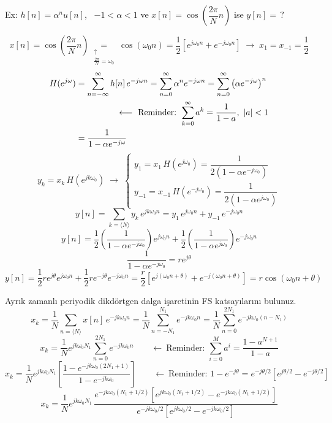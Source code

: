 \documentclass[11pt,a4paper]{article}
\begin{document}
\begin{ornek}
Ex: $h[n]=\alpha^n u[n]$, \ $-1<\alpha<1$ ve $x[n]=\cos\left(\dfrac{2\pi}{N}n\right)$ ise $y[n]=\,?$
\end{ornek}
\[ x[n]=\cos\left(\frac{2\pi}{N}n\right)\underset{\substack{\uparrow\\ \frac{2\pi}{N}=\omega_0}}{=}\cos(\omega_0 n)=\frac{1}{2}\left[e^{j\omega_0 n}+e^{-j\omega_0 n}\right] \;\longrightarrow\; x_1=x_{-1}=\frac{1}{2} \]
\begin{align*}
H(e^{j\omega}) &= \sum_{n=-\infty}^{\infty} h[n]\,e^{-j\omega n}=\sum_{n=0}^{\infty}\alpha^n e^{-j\omega n}=\sum_{n=0}^{\infty}\left(\alpha e^{-j\omega}\right)^n\\
&\hphantom{=}\qquad\qquad\longleftarrow\ \text{Reminder: } \sum_{k=0}^{\infty} a^k=\frac{1}{1-a},\ |a|<1\\
&= \frac{1}{1-\alpha e^{-j\omega}}
\end{align*}
\[ y_k=x_k\,H(e^{jk\omega_0}) \;\longrightarrow\;
\begin{cases}
y_1=x_1\,H(e^{j\omega_0})=\dfrac{1}{2\left(1-\alpha e^{-j\omega_0}\right)}\\[4mm]
y_{-1}=x_{-1}\,H(e^{-j\omega_0})=\dfrac{1}{2\left(1-\alpha e^{j\omega_0}\right)}
\end{cases} \]
\[ y[n]=\sum_{k=\langle N\rangle} y_k\,e^{jk\omega_0 n}=y_1\,e^{j\omega_0 n}+y_{-1}\,e^{-j\omega_0 n} \]
\[ y[n]=\frac{1}{2}\left(\frac{1}{1-\alpha e^{-j\omega_0}}\right)e^{j\omega_0 n}+\frac{1}{2}\left(\frac{1}{1-\alpha e^{j\omega_0}}\right)e^{-j\omega_0 n} \]
\[ \frac{1}{1-\alpha e^{-j\omega_0}}=re^{j\theta} \]
\[ y[n]=\frac{1}{2}re^{j\theta}e^{j\omega_0 n}+\frac{1}{2}re^{-j\theta}e^{-j\omega_0 n}=\frac{r}{2}\left[e^{j(\omega_0 n+\theta)}+e^{-j(\omega_0 n+\theta)}\right]=r\cos(\omega_0 n+\theta) \]

\bigskip
Ayrık zamanlı periyodik dikdörtgen dalga işaretinin FS katsayılarını bulunuz.
\[ x_k=\frac{1}{N}\sum_{n=\langle N\rangle} x[n]\,e^{-jk\omega_0 n}=\frac{1}{N}\sum_{n=-N_1}^{N_1} e^{-jk\omega_0 n}=\frac{1}{N}\sum_{n=0}^{2N_1} e^{-jk\omega_0 (n-N_1)} \]
\[ x_k=\frac{1}{N}e^{jk\omega_0 N_1}\sum_{n=0}^{2N_1} e^{-jk\omega_0 n} \qquad\longleftarrow\ \text{Reminder: } \sum_{i=0}^{M} a^i=\frac{1-a^{N+1}}{1-a} \]
\[ x_k=\frac{1}{N}e^{jk\omega_0 N_1}\left[\frac{1-e^{-jk\omega_0(2N_1+1)}}{1-e^{-jk\omega_0}}\right] \qquad\longleftarrow\ \text{Reminder: } 1-e^{-j\theta}=e^{-j\theta/2}\left[e^{j\theta/2}-e^{-j\theta/2}\right] \]
\[ x_k=\frac{1}{N}e^{jk\omega_0 N_1}\,\frac{e^{-jk\omega_0(N_1+1/2)}\left[e^{jk\omega_0(N_1+1/2)}-e^{-jk\omega_0(N_1+1/2)}\right]}{e^{-jk\omega_0/2}\left[e^{jk\omega_0/2}-e^{-jk\omega_0/2}\right]} \]
\end{document}
